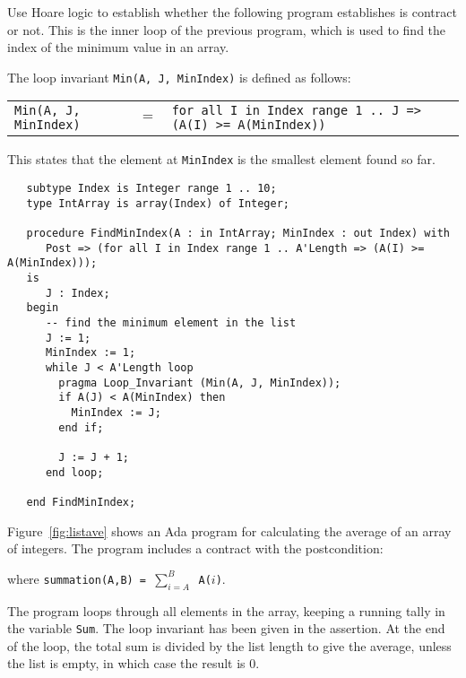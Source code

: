 \begin{omitable}
{


Use Hoare logic to establish whether the following program establishes is contract or not. This is the inner loop of the previous program, which is used to find the index of the minimum value in an array.

The loop invariant {\tt  Min(A, J, MinIndex)} is defined as follows:

\begin{tabular}{lll}
 {\tt Min(A, J, MinIndex)} & $=$ & {\tt for all I in Index range 1 .. J => (A(I) >= A(MinIndex))}\\
\end{tabular}

This states that the element at {\tt MinIndex} is the smallest element found so far.

\begin{verbatim}
   subtype Index is Integer range 1 .. 10;
   type IntArray is array(Index) of Integer;

   procedure FindMinIndex(A : in IntArray; MinIndex : out Index) with
      Post => (for all I in Index range 1 .. A'Length => (A(I) >= A(MinIndex)));
   is
      J : Index;
   begin
      -- find the minimum element in the list
      J := 1;
      MinIndex := 1;
      while J < A'Length loop
        pragma Loop_Invariant (Min(A, J, MinIndex));
        if A(J) < A(MinIndex) then
          MinIndex := J;
        end if;

        J := J + 1;
      end loop;

   end FindMinIndex;
\end{verbatim}  
}
\end{omitable}



Figure~\ref{fig:listave} shows an Ada program for calculating the average of an array of integers. The program includes a contract with the postcondition:



where   {\tt summation(A,B) = $\sum_{i=A}^{B}$ \tt A($i$)}.

The program loops through all elements in the array, keeping a running tally in the variable {\tt Sum}. The loop invariant has been given in the assertion. At the end of the loop, the total sum is divided by the list length to give the average, unless the list is empty, in which case the result is 0.

